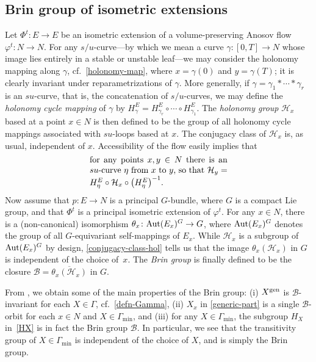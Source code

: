 \documentclass[pdftex]{sigma}
\numberwithin{equation}{section}
\theoremstyle{definition}
\begin{document}
\subsection{Brin group of isometric extensions}

Let $\Phi^t \colon E \rightarrow E$ be an isometric extension of a volume-preserving Anosov flow $\varphi^t \colon N \rightarrow N$. For any $s/u$-curve---by which we mean a curve $\gamma \colon [0,T] \rightarrow N$ whose image lies entirely in a stable or unstable leaf---we may consider the holonomy mapping  along $\gamma$, cf.\ \eqref{holonomy-map}, where $x=\gamma(0)$ and $y=\gamma(T)$; it is clearly invariant under reparametrizations of $\gamma$. More generally, if $\gamma = \gamma_1 \ast \cdots \ast\gamma_r$ is an $su$-curve, that is, the concatenation of $s/u$-curves, we may define the \emph{holonomy cycle mapping} of $\gamma$ by $H^E_\gamma = H^E_{\gamma_r}\circ \cdots \circ H^E_{\gamma_1}$. The \emph{holonomy group} $\mathcal{H}_x$ based at a point $x\in N$ is then defined to be the group of all holonomy cycle mappings associated with $su$-loops based at $x$. The conjugacy class of $\mathcal{H}_x$ is, as usual, independent of $x$. Accessibility of the flow easily implies that \begin{equation}\label{conjugacy-class-hol}
 \parbox{.47\textwidth}{for any points $x,y\in N$ there is an $su$-curve $\eta$ from $x$ to $y$, so that $\mathcal{H}_y = H^E_\eta \circ \mathcal{H}_x\circ \bigl(H^E_\eta\bigr)^{-1}$.}
\end{equation}
Now assume that $p\colon E\to N$ is a principal $G$-bundle, where $G$ is a compact Lie group, and that $\Phi^t$ is a principal isometric extension of $\varphi^t$. For any $x\in N$, there is a (non-canonical) isomorphism $\theta_x\colon {\rm Aut}(E_x)^G \to G$, where ${\rm Aut}(E_x)^G$ denotes the group of all $G$-equivariant self-mappings of $E_x$. While $\mathcal{H}_x$ is a subgroup of ${\rm Aut}(E_x)^G$ by design, \eqref{conjugacy-class-hol} tells us that the image $\theta_x(\mathcal{H}_x)$ in $G$ is independent of the choice of~$x$. The \emph{Brin group} is finally defined to be the closure $\mathcal{B} = \overline{\theta_x(\mathcal{H}_x)}$ in $G$.

From \cite[Corollary 2.2.13 and Propositions~2.2.15 and~2.2.16]{filip2024finiteness}, we obtain some of the main properties of the Brin group: (i) $X^{\rm gen}$ is $\mathcal{B}$-invariant for each $X\in \Gamma$, cf.~\eqref{defn-Gamma}, (ii) $X_x$ in \eqref{generic-part} is a single $\mathcal{B}$-orbit for each $x\in N$ and $X\in \Gamma_{\min}$, and (iii) for any $X\in \Gamma_{\min}$, the subgroup $H_X$ in~\eqref{HX} is in fact the Brin group $\mathcal{B}$. In particular, we see that the transitivity group of $X \in \Gamma_{\min}$ is independent of the choice of $X$, and is simply the Brin group.
\end{document}
